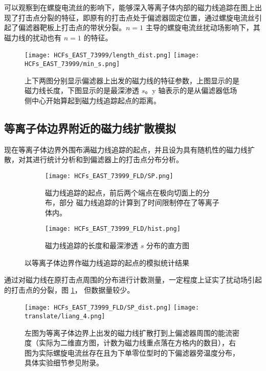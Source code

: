 可以观察到在螺旋电流丝的影响下，能够深入等离子体内部的磁力线追踪在图上出现了打击点分裂的特征，即原有的打击点处于偏滤器固定位置，通过螺旋电流丝引起了偏滤器靶板上打击点的带状分裂。$n=1$ 主导的螺旋电流丝扰动场影响下，其磁力线的扰动也有 $n=1$ 的特征。

\begin{figure}[htbp]
  \centering%
      \texttt{[image: HCFs\_EAST\_73999/length\_dist.png]}
      \texttt{[image: HCFs\_EAST\_73999/min\_s.png]}
      \caption{上下两图分别显示偏滤器上出发的磁力线的特征参数，上图显示的是磁力线长度，下图显示的是最深渗透 $s$。y 轴表示的是从偏滤器低场侧中心开始算起到磁力线追踪起点的距离。}
\end{figure}

\subsection{等离子体边界附近的磁力线扩散模拟}
现在等离子体边界外围布满磁力线追踪的起点，并且设为具有随机性的磁力线扩散，对其进行统计分析和到偏滤器上的打击点分布分析。 

\begin{figure}[htbp]
    \centering
  \begin{subfigure}{0.4\textwidth}
    \texttt{[image: HCFs\_EAST\_73999\_FLD/SP.png]}
    \caption{磁力线追踪的起点，前后两个端点在极向切面上的分布，部分 磁力线追踪的计算到了时间限制停在了等离子体内。}
  \end{subfigure}%
  \begin{subfigure}{0.57\textwidth}
    \texttt{[image: HCFs\_EAST\_73999\_FLD/hist.png]}
    \caption{磁力线追踪的长度和最深渗透 $s$ 分布的直方图}
  \end{subfigure}%
  \caption{以等离子体边界作磁力线追踪的起点的模拟统计结果}
  \end{figure}
  
通过对磁力线在原打击点周围的分布进行计数测量，一定程度上证实了扰动场引起的打击点的分裂，图 \ref{fig:sp-on-divertor}， 但数据量较少。
  
\begin{figure}[htbp]
    \centering%
        \texttt{[image: HCFs\_EAST\_73999\_FLD/SP\_dist.png]}
        \texttt{[image: translate/liang\_4.png]}
        \caption{左图为等离子体边界上出发的磁力线扩散打到上偏滤器周围的能流密度（实际为二维直方图，计数为磁力线重点落在方格内的数目），右图为实际螺旋电流丝存在且为下单零位型时的下偏滤器旁温度分布，具体实验细节参见附录。}
        \label{fig:sp-on-divertor}
  \end{figure}

